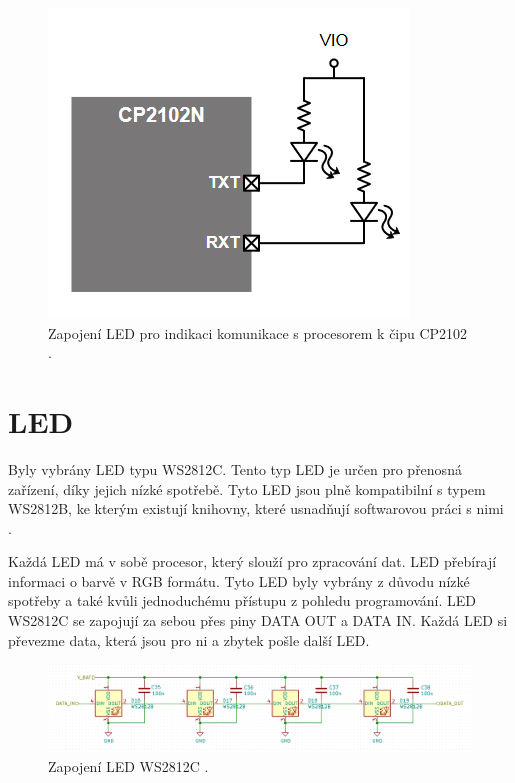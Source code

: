 \begin{figure}[!h]
    \begin{center}
      \includegraphics[scale=0.5]{obrazky/CP2102_LED.png}
    \end{center}
    \caption[CP2102 LED]{Zapojení LED pro indikaci komunikace s procesorem k čipu CP2102 \cite{CP2102_datasheet}.}
\end{figure}

\section{LED}
Byly vybrány LED typu WS2812C. Tento typ LED je určen pro přenosná zařízení, díky jejich nízké spotřebě. Tyto LED jsou plně
kompatibilní s typem WS2812B, ke kterým existují knihovny, které usnadňují softwarovou práci s nimi \cite{WS2812C_datasheet}.

Každá LED má v sobě procesor, který slouží pro zpracování dat. LED přebírají informaci o barvě v RGB formátu. 
Tyto LED byly vybrány z důvodu nízké spotřeby a také kvůli jednoduchému přístupu z pohledu programování.
LED WS2812C se zapojují za sebou přes piny DATA OUT a DATA IN. Každá LED si převezme data, která jsou pro ni a zbytek pošle 
další LED.

\begin{figure}[!h]
    \begin{center}
      \includegraphics[scale=0.5]{obrazky/WS2812C_spojeni.png}
    \end{center}
    \caption[WS2812C spojení]{Zapojení LED WS2812C \cite{WS2812C_datasheet}.}
\end{figure}

